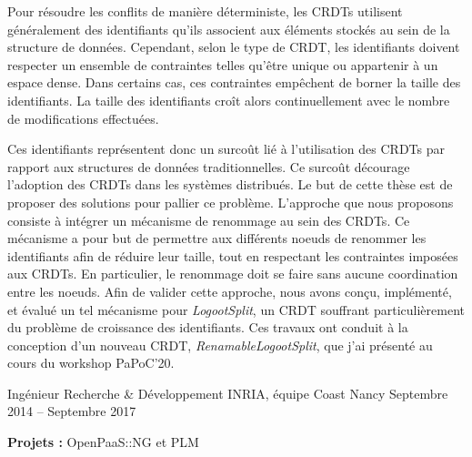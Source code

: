 \documentclass[12pt, a4paper]{awesome-cv}
\begin{document}
\begin{cventries}
\begin{cvparagraph}
  Pour résoudre les conflits de manière déterministe, les \acp{CRDT} utilisent généralement des identifiants qu'ils associent aux éléments stockés au sein de la structure de données.
  Cependant, selon le type de \ac{CRDT}, les identifiants doivent respecter un ensemble de contraintes telles qu'être unique ou appartenir à un espace dense.
  Dans certains cas, ces contraintes empêchent de borner la taille des identifiants.
  La taille des identifiants croît alors continuellement avec le nombre de modifications effectuées.

  Ces identifiants représentent donc un surcoût lié à l'utilisation des \acp{CRDT} par rapport aux structures de données traditionnelles.
  Ce surcoût décourage l'adoption des \acp{CRDT} dans les systèmes distribués.
  Le but de cette thèse est de proposer des solutions pour pallier ce problème.
  L'approche que nous proposons consiste à intégrer un mécanisme de renommage au sein des \acp{CRDT}.
  Ce mécanisme a pour but de permettre aux différents noeuds de renommer les identifiants afin de réduire leur taille, tout en respectant les contraintes imposées aux \acp{CRDT}.
  En particulier, le renommage doit se faire sans aucune coordination entre les noeuds.
  Afin de valider cette approche, nous avons conçu, implémenté, et évalué un tel mécanisme pour \emph{LogootSplit}, un \ac{CRDT} souffrant particulièrement du problème de croissance des identifiants.
  Ces travaux ont conduit à la conception d'un nouveau \ac{CRDT}, \emph{RenamableLogootSplit}, que j'ai présenté au cours du workshop PaPoC'20.

  \begin{description}[labelindent=1.6em,itemsep=-0.3em]
    \item {}
    \item {}
  \end{description}
\end{cvparagraph}

\cventry
  {Ingénieur Recherche \& Développement} %
  {INRIA, équipe Coast} %
  {Nancy} %
  {Septembre 2014 – Septembre 2017} %
  {
    \begin{cvitems} %
      \item {\textbf{Projets :} OpenPaaS::NG et PLM}
    \end{cvitems}
  }



\end{cventries}
\end{document}
